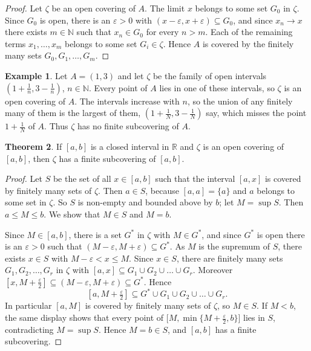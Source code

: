 \documentclass[11pt,a4paper]{article}
\numberwithin{equation}{section}
\theoremstyle{definition}
\newtheorem{thm}{Theorem}[subsection]
\newtheorem{exa}[thm]{Example}
\begin{document}
\begin{proof}
Let $\zeta$ be an open covering of $A$. The limit $x$ belongs to some set $G_0$ in $\zeta$. Since $G_0$ is open, there is an $\varepsilon > 0$ with $(x- \varepsilon, x + \varepsilon) \subseteq G_0$, and since $x_n\longrightarrow x$ there exists $m\in \mathbb{N}$ such that $x_n\in G_0$ for every $n > m$. Each of the remaining terms $x_1,\dots,x_m$ belongs to some set $G_i \in \zeta$. Hence $A$ is covered by the finitely many sets $G_0, G_1, \dots, G_m$.
\end{proof}


\begin{exa}
Let $A = (1,3)$ and let $\zeta$ be the family of open intervals $\left( 1 + \frac{1}{n}, 3-\frac{1}{n}\right)$, $n\in \mathbb{N}$. Every point of $A$ lies in one of these intervals, so $\zeta$ is an open covering of $A$. The intervals increase with $n$, so the union of any finitely many of them is the largest of them, $\left( 1 + \frac{1}{N}, 3-\frac{1}{N}\right)$ say, which misses the point $1+\frac{1}{N}$ of $A$. Thus $\zeta$ has no finite subcovering of $A$.
\end{exa}


\begin{thm}
If $[a,b]$ is a closed interval in $\mathbb{R}$ and $\zeta$ is an open covering of $[a,b]$, then $\zeta$ has a finite subcovering of $[a,b]$.
\end{thm}

\begin{proof}
Let $S$ be the set of all $x\in [a,b]$ such that the interval $[a,x]$ is covered by finitely many sets of $\zeta$. Then $a\in S$, because $[a,a] = \{a\}$ and $a$ belongs to some set in $\zeta$. So $S$ is non-empty and bounded above by $b$; let $M= \sup S$. Then $a\leq M \leq b$. We show that $M\in S$ and $M = b$.

Since $M\in [a,b]$, there is a set $G^*$ in $\zeta$ with $M \in G^*$, and since $G^*$ is open there is an $\varepsilon > 0$ such that $(M - \varepsilon, M + \varepsilon) \subseteq G^*$. As $M$ is the supremum of $S$, there exists $x \in S$ with $M - \varepsilon < x \leq M$. Since $x\in S$, there are finitely many sets $G_1, G_2, \dots, G_r$ in $\zeta$ with $[a,x] \subseteq G_1 \cup G_2 \cup \dots \cup G_r$. Moreover $[x,M+\frac{\varepsilon}{2}] \subseteq (M - \varepsilon, M + \varepsilon) \subseteq G^*$. Hence
$$\left[a, M+\tfrac{\varepsilon}{2}\right] \subseteq G^*\cup G_1 \cup G_2 \cup \dots \cup G_r .$$
In particular $[a,M]$ is covered by finitely many sets of $\zeta$, so $M\in S$. If $M<b$, the same display shows that every point of $\bigl[M, \min\{M+\frac{\varepsilon}{2}, b\}\bigr]$ lies in $S$, contradicting $M=\sup S$. Hence $M = b\in S$, and $[a,b]$ has a finite subcovering.
\end{proof}
\end{document}
